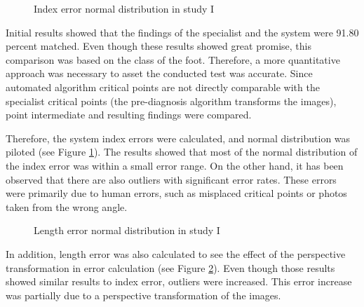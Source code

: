 \begin{figure}[htbp]
\centering
{}
\caption{Index error normal distribution in study I}
\label{fig:StudyIIndexErrorNormalDists}
\end{figure}

Initial results showed that the findings of the specialist and the system were 91.80 percent matched. Even though these results showed great promise, this comparison was based on the class of the foot. Therefore, a more quantitative approach was necessary to asset the conducted test was accurate. Since automated algorithm critical points are not directly comparable with the specialist critical points (the pre-diagnosis algorithm transforms the images), point intermediate and resulting findings were compared.

Therefore, the system index errors were calculated, and normal distribution was piloted (see Figure \ref{fig:StudyIIndexErrorNormalDists}). The results showed that most of the normal distribution of the index error was within a small error range. On the other hand, it has been observed that there are also outliers with significant error rates. These errors were primarily due to human errors, such as misplaced critical points or photos taken from the wrong angle. 

\begin{figure}[htbp]
\centering
{}
\caption{Length error normal distribution in study I}
\label{fig:StudyILenghtErrorNormalDists}
\end{figure}

In addition, length error was also calculated to see the effect of the perspective transformation in error calculation (see Figure \ref{fig:StudyILenghtErrorNormalDists}). Even though those results showed similar results to index error, outliers were increased. This error increase was partially due to a perspective transformation of the images.
